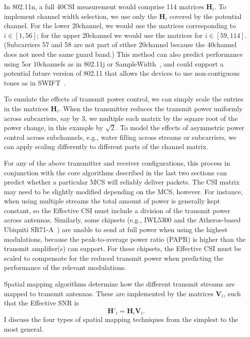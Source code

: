  In 802.11n, a full 40\MHz CSI measurement would comprise 114 matrices $\mathbf{H}_i$. To implement channel width selection, we use only the $\mathbf{H}_i$ covered by the potential channel. For the lower 20\MHz channel, we would use the matrices corresponding to $i \in [1,56]$; for the upper 20\MHz channel we would use the matrices for $i \in [59,114]$. (Subcarriers 57 and 58 are not part of either 20\MHz channel because the 40\MHz channel does not need the same guard band.) This method can also predict performance using 5\MHz or 10\MHz channels as in 802.11j or SampleWidth~\cite{Chandra_SampleWidth}, and could support a potential future version of 802.11 that allows the devices to use non-contiguous tones as in SWIFT~\cite{Rahul_SWIFT}.

 To emulate the effects of transmit power control, we can simply scale the entries in the matrices $\mathbf{H}_i$. When the transmitter reduces the transmit power uniformly across subcarriers, say by 3\dB, we multiple each matrix by the square root of the power change, in this example by $\sqrt{2}$. To model the effects of asymmetric power control across subchannels, e.g., water filling across streams or subcarriers, we can apply scaling differently to different parts of the channel matrix.

 For any of the above transmitter and receiver configurations, this process in conjunction with the core algorithms described in the last two sections can predict whether a particular MCS will reliably deliver packets. The CSI matrix may need to be slightly modified depending on the MCS, however. For instance, when using multiple streams the total amount of power is generally kept constant, so the Effective CSI must include a division of the transmit power across antennas. Similarly, some chipsets (e.g., IWL5300 and the Atheros-based Ubiquiti SR71-A~\cite{sr71a}) are unable to send at full power when using the highest modulations, because the peak-to-average power ratio (PAPR) is higher than the transmit amplifier(s) can support. For these chipsets, the Effective CSI must be scaled to compensate for the reduced transmit power when predicting the performance of the relevant modulations.

 Spatial mapping algorithms determine how the different transmit streams are mapped to transmit antennas. These are implemented by the matrices $\mathbf{V}_i$, such that the Effective SNR is
\begin{equation}
	\mathbf{H}'_i = \mathbf{H}_i\mathbf{V}_i.
\end{equation}
I discuss the four types of spatial mapping techniques from the simplest to the most general.

